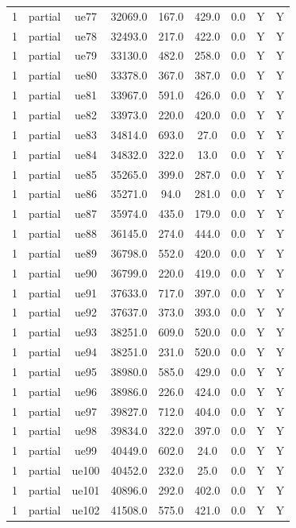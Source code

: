 \begin{table}[ht]
\begin{tabular}{|c|c|c|c|c|c|c|c|c|}
1 & partial & ue77 & 32069.0 & 167.0 & 429.0 & 0.0 & Y & Y \\
1 & partial & ue78 & 32493.0 & 217.0 & 422.0 & 0.0 & Y & Y \\
1 & partial & ue79 & 33130.0 & 482.0 & 258.0 & 0.0 & Y & Y \\
1 & partial & ue80 & 33378.0 & 367.0 & 387.0 & 0.0 & Y & Y \\
1 & partial & ue81 & 33967.0 & 591.0 & 426.0 & 0.0 & Y & Y \\
1 & partial & ue82 & 33973.0 & 220.0 & 420.0 & 0.0 & Y & Y \\
1 & partial & ue83 & 34814.0 & 693.0 & 27.0 & 0.0 & Y & Y \\
1 & partial & ue84 & 34832.0 & 322.0 & 13.0 & 0.0 & Y & Y \\
1 & partial & ue85 & 35265.0 & 399.0 & 287.0 & 0.0 & Y & Y \\
1 & partial & ue86 & 35271.0 & 94.0 & 281.0 & 0.0 & Y & Y \\
1 & partial & ue87 & 35974.0 & 435.0 & 179.0 & 0.0 & Y & Y \\
1 & partial & ue88 & 36145.0 & 274.0 & 444.0 & 0.0 & Y & Y \\
1 & partial & ue89 & 36798.0 & 552.0 & 420.0 & 0.0 & Y & Y \\
1 & partial & ue90 & 36799.0 & 220.0 & 419.0 & 0.0 & Y & Y \\
1 & partial & ue91 & 37633.0 & 717.0 & 397.0 & 0.0 & Y & Y \\
1 & partial & ue92 & 37637.0 & 373.0 & 393.0 & 0.0 & Y & Y \\
1 & partial & ue93 & 38251.0 & 609.0 & 520.0 & 0.0 & Y & Y \\
1 & partial & ue94 & 38251.0 & 231.0 & 520.0 & 0.0 & Y & Y \\
1 & partial & ue95 & 38980.0 & 585.0 & 429.0 & 0.0 & Y & Y \\
1 & partial & ue96 & 38986.0 & 226.0 & 424.0 & 0.0 & Y & Y \\
1 & partial & ue97 & 39827.0 & 712.0 & 404.0 & 0.0 & Y & Y \\
1 & partial & ue98 & 39834.0 & 322.0 & 397.0 & 0.0 & Y & Y \\
1 & partial & ue99 & 40449.0 & 602.0 & 24.0 & 0.0 & Y & Y \\
1 & partial & ue100 & 40452.0 & 232.0 & 25.0 & 0.0 & Y & Y \\
1 & partial & ue101 & 40896.0 & 292.0 & 402.0 & 0.0 & Y & Y \\
1 & partial & ue102 & 41508.0 & 575.0 & 421.0 & 0.0 & Y & Y \\

\end{tabular}
\end{table}
